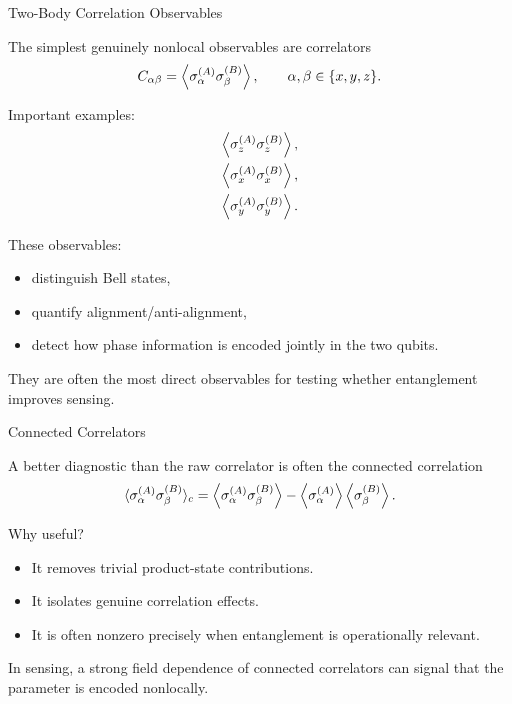 \documentclass{beamer}
\begin{document}
\begin{frame}{Two-Body Correlation Observables}

The simplest genuinely nonlocal observables are correlators
\[
C_{\alpha\beta}=\expval{\sigma_\alpha^{(A)}\sigma_\beta^{(B)}},
\qquad \alpha,\beta\in\{x,y,z\}.
\]

Important examples:
\begin{align}
\expval{\sigma_z^{(A)}\sigma_z^{(B)}}, \\
\expval{\sigma_x^{(A)}\sigma_x^{(B)}}, \\
\expval{\sigma_y^{(A)}\sigma_y^{(B)}}.
\end{align}

These observables:
\begin{itemize}
    \item distinguish Bell states,
    \item quantify alignment/anti-alignment,
    \item detect how phase information is encoded jointly in the two qubits.
\end{itemize}

They are often the most direct observables for testing whether entanglement improves sensing.

\end{frame}

\begin{frame}{Connected Correlators}

A better diagnostic than the raw correlator is often the connected correlation
\[
\langle \sigma_\alpha^{(A)}\sigma_\beta^{(B)} \rangle_c
=
\expval{\sigma_\alpha^{(A)}\sigma_\beta^{(B)}}
-
\expval{\sigma_\alpha^{(A)}}\expval{\sigma_\beta^{(B)}}.
\]

Why useful?
\begin{itemize}
    \item It removes trivial product-state contributions.
    \item It isolates genuine correlation effects.
    \item It is often nonzero precisely when entanglement is operationally relevant.
\end{itemize}

In sensing, a strong field dependence of connected correlators can signal
that the parameter is encoded nonlocally.

\end{frame}
\end{document}
